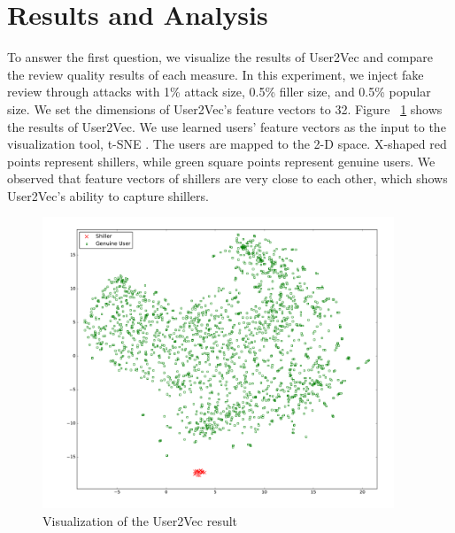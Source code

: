 \documentclass[master,english,final]{kaist-ucs}
\begin{document}
\section{Results and Analysis}
To answer the first question, we visualize the results of User2Vec and compare the review quality results of each measure.
In this experiment, we inject fake review through attacks with 1\% attack size, 0.5\% filler size, and 0.5\% popular size.
We set the dimensions of User2Vec's feature vectors to 32.
Figure ~\ref{user2vec_result} shows the results of User2Vec.
We use learned users' feature vectors as the input to the visualization tool, t-SNE \cite{TSNE}.
The users are mapped to the 2-D space.
X-shaped red points represent shillers, while green square points represent genuine users.
We observed that feature vectors of shillers are very close to each other, which shows User2Vec's ability to capture shillers.
\begin{figure}[h]
    \centerline{\includegraphics[width=10.5cm]{figure/user2vec_result.pdf}}
    \caption{Visualization of the User2Vec result}
    \label{user2vec_result}
\end{figure}
\end{document}
